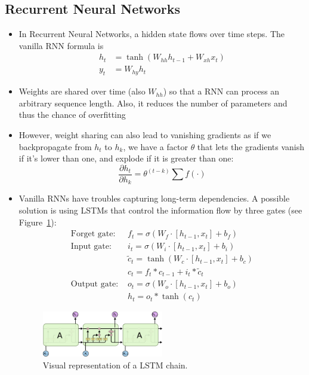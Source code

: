 \subsection{Recurrent Neural Networks}
\begin{itemize}
	\item In Recurrent Neural Networks, a hidden state flows over time steps. The vanilla RNN formula is
	\begin{equation*}
		\begin{split}
			h_t & = \tanh \left(W_{hh}h_{t-1} + W_{xh} x_{t}\right)\\
			y_t & = W_{hy} h_t
		\end{split}
	\end{equation*}
	\item Weights are shared over time (also $W_{hh}$) so that a RNN can process an arbitrary sequence length. Also, it reduces the number of parameters and thus the chance of overfitting 
	\item However, weight sharing can also lead to vanishing gradients as if we backpropagate from $h_t$ to $h_k$, we have a factor $\theta$ that lets the gradients vanish if it's lower than one, and explode if it is greater than one:
	$$\frac{\partial h_t}{\partial h_k} = \theta^{(t-k)} \sum f(\cdot)$$
	\item Vanilla RNNs have troubles capturing long-term dependencies. A possible solution is using LSTMs that control the information flow by three gates (see Figure~\ref{fig:deep_video_LSTM}):
	\begin{equation*}
		\begin{split}
			\text{Forget gate:  } & f_t = \sigma\left(W_f \cdot \left[h_{t-1}, x_t\right] + b_f\right)\\[7pt]
			\text{Input gate:  } & i_t = \sigma\left(W_i \cdot \left[h_{t-1}, x_t\right] + b_i\right)\\
			& \tilde{c}_t = \tanh\left(W_c \cdot \left[h_{t-1}, x_t\right] + b_c\right)\\
			& c_t = f_t * c_{t-1} + i_t * \tilde{c}_t\\[7pt]
			\text{Output gate:  } & o_t = \sigma\left(W_o \cdot \left[h_{t-1}, x_t\right] + b_o\right)\\
			& h_t = o_t * \tanh\left(c_t\right)
		\end{split}
	\end{equation*}
	\begin{figure}[ht!]
		\centering
		\includegraphics[width=0.5\textwidth]{figures/cv_deep_video_LSTM.png}
		\caption{Visual representation of a LSTM chain.}
		\label{fig:deep_video_LSTM}
	\end{figure}
\end{itemize}
